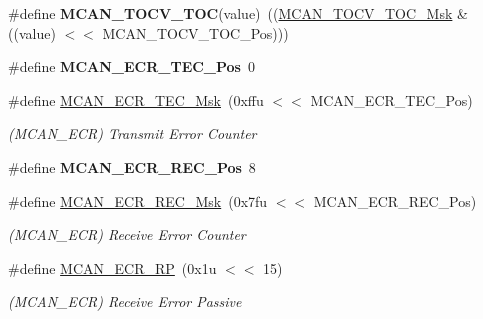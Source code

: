 \begin{DoxyCompactItemize}
\mbox{\label{group__SAMV71__MCAN_gaa0f268eeade7bd9012b7e5828f511ba3}} 
\#define {\bfseries M\+C\+A\+N\+\_\+\+T\+O\+C\+V\+\_\+\+T\+OC}(value)~((\mbox{\hyperlink{group__SAMV71__MCAN_gad85d6aea1ff1f7f67073ce2494e37452}{M\+C\+A\+N\+\_\+\+T\+O\+C\+V\+\_\+\+T\+O\+C\+\_\+\+Msk}} \& ((value) $<$$<$ M\+C\+A\+N\+\_\+\+T\+O\+C\+V\+\_\+\+T\+O\+C\+\_\+\+Pos)))
\item 
\mbox{\label{group__SAMV71__MCAN_ga56731c3f59868ca6504a7b18c20d9dac}} 
\#define {\bfseries M\+C\+A\+N\+\_\+\+E\+C\+R\+\_\+\+T\+E\+C\+\_\+\+Pos}~0
\item 
\mbox{\label{group__SAMV71__MCAN_ga9f4a332c5158c62be7223aa07dc7d107}} 
\#define \mbox{\hyperlink{group__SAMV71__MCAN_ga9f4a332c5158c62be7223aa07dc7d107}{M\+C\+A\+N\+\_\+\+E\+C\+R\+\_\+\+T\+E\+C\+\_\+\+Msk}}~(0xffu $<$$<$ M\+C\+A\+N\+\_\+\+E\+C\+R\+\_\+\+T\+E\+C\+\_\+\+Pos)
\begin{DoxyCompactList}\small\item\em (M\+C\+A\+N\+\_\+\+E\+CR) Transmit Error Counter \end{DoxyCompactList}\item 
\mbox{\label{group__SAMV71__MCAN_gab238e31d590b78aa6af737f621243fbd}} 
\#define {\bfseries M\+C\+A\+N\+\_\+\+E\+C\+R\+\_\+\+R\+E\+C\+\_\+\+Pos}~8
\item 
\mbox{\label{group__SAMV71__MCAN_gad879edddc84f5813e80b170716cadc79}} 
\#define \mbox{\hyperlink{group__SAMV71__MCAN_gad879edddc84f5813e80b170716cadc79}{M\+C\+A\+N\+\_\+\+E\+C\+R\+\_\+\+R\+E\+C\+\_\+\+Msk}}~(0x7fu $<$$<$ M\+C\+A\+N\+\_\+\+E\+C\+R\+\_\+\+R\+E\+C\+\_\+\+Pos)
\begin{DoxyCompactList}\small\item\em (M\+C\+A\+N\+\_\+\+E\+CR) Receive Error Counter \end{DoxyCompactList}\item 
\mbox{\label{group__SAMV71__MCAN_gafc02132b36db5a896071fd0a7ba2b89c}} 
\#define \mbox{\hyperlink{group__SAMV71__MCAN_gafc02132b36db5a896071fd0a7ba2b89c}{M\+C\+A\+N\+\_\+\+E\+C\+R\+\_\+\+RP}}~(0x1u $<$$<$ 15)
\begin{DoxyCompactList}\small\item\em (M\+C\+A\+N\+\_\+\+E\+CR) Receive Error Passive \end{DoxyCompactList}\item 

\end{DoxyCompactItemize}
